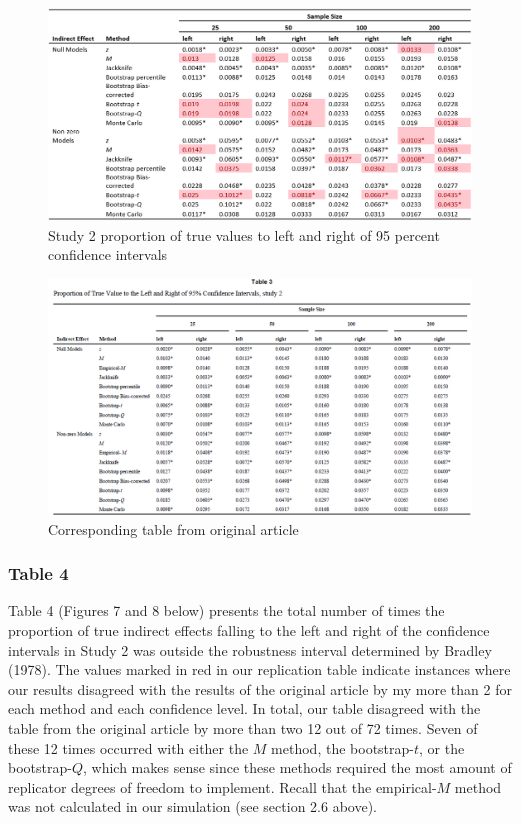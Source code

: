 \documentclass[10,a4paperpaper,]{article}
\begin{document}
\newpage
\begin{landscape}

\begin{figure}
\includegraphics[width=1\linewidth]{RepliSimsTable3} \caption{Study 2 proportion of true values to left and right of 95 percent confidence intervals}\label{fig:unnamed-chunk-5}
\end{figure}

\begin{figure}
\includegraphics[width=1\linewidth]{RepliSimsMacKinnonTable3} \caption{Corresponding table from original article}\label{fig:unnamed-chunk-6}
\end{figure}

\end{landscape}

\newpage

\subsubsection{Table 4}

Table 4 (Figures 7 and 8 below) presents the total number of times the
proportion of true indirect effects falling to the left and right of the
confidence intervals in Study 2 was outside the robustness interval
determined by Bradley (1978). The values marked in red in our
replication table indicate instances where our results disagreed with
the results of the original article by my more than 2 for each method
and each confidence level. In total, our table disagreed with the table
from the original article by more than two 12 out of 72 times. Seven of
these 12 times occurred with either the \(M\) method, the
bootstrap-\(t\), or the bootstrap-\(Q\), which makes sense since these
methods required the most amount of replicator degrees of freedom to
implement. Recall that the empirical-\(M\) method was not calculated in
our simulation (see section 2.6 above).
\end{document}

